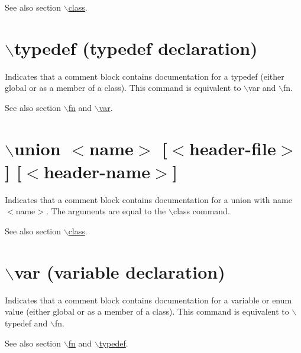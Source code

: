 \begin{DoxySeeAlso}{See also}
section \hyperlink{commands_cmdclass}{$\backslash$class}.
\end{DoxySeeAlso}


 \hypertarget{commands_cmdtypedef}{}\section{$\backslash$typedef (typedef declaration)}\label{commands_cmdtypedef}
 Indicates that a comment block contains documentation for a typedef (either global or as a member of a class). This command is equivalent to $\backslash$var and $\backslash$fn.

\begin{DoxySeeAlso}{See also}
section \hyperlink{commands_cmdfn}{$\backslash$fn} and \hyperlink{commands_cmdvar}{$\backslash$var}.
\end{DoxySeeAlso}


 \hypertarget{commands_cmdunion}{}\section{$\backslash$union $<$name$>$ \mbox{[}$<$header-\/file$>$\mbox{]} \mbox{[}$<$header-\/name$>$\mbox{]}}\label{commands_cmdunion}
 Indicates that a comment block contains documentation for a union with name $<$name$>$. The arguments are equal to the $\backslash$class command.

\begin{DoxySeeAlso}{See also}
section \hyperlink{commands_cmdclass}{$\backslash$class}.
\end{DoxySeeAlso}


 \hypertarget{commands_cmdvar}{}\section{$\backslash$var (variable declaration)}\label{commands_cmdvar}
 Indicates that a comment block contains documentation for a variable or enum value (either global or as a member of a class). This command is equivalent to $\backslash$typedef and $\backslash$fn.

\begin{DoxySeeAlso}{See also}
section \hyperlink{commands_cmdfn}{$\backslash$fn} and \hyperlink{commands_cmdtypedef}{$\backslash$typedef}.
\end{DoxySeeAlso}


